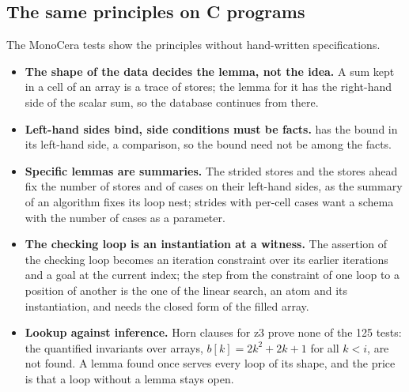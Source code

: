 \subsection{The same principles on C programs}\label{sec:principles:monocera}
The MonoCera tests show the principles without hand-written specifications.
\begin{itemize}[nosep]
\item \textbf{The shape of the data decides the lemma, not the idea.} A sum kept in a cell of an array is a trace of
  stores; the lemma for it has the right-hand side of the scalar sum, so the database continues from there.
\item \textbf{Left-hand sides bind, side conditions must be facts.}  has the bound in its
  left-hand side, a comparison, so the bound need not be among the facts.
\item \textbf{Specific lemmas are summaries.} The strided stores and the stores ahead fix the number of stores and of
  cases on their left-hand sides, as the summary of an algorithm fixes its loop nest; strides with per-cell cases want a
  schema with the number of cases as a parameter.
\item \textbf{The checking loop is an instantiation at a witness.} The assertion of the checking loop becomes an
  iteration constraint over its earlier iterations and a goal at the current index; the step from the constraint of one
  loop to a position of another is the one of the linear search, an atom and its instantiation, and needs the closed form
  of the filled array.
\item \textbf{Lookup against inference.} Horn clauses for z3 prove none of the 125 tests: the quantified invariants
  over arrays, $b[k] = 2k^2 + 2k + 1$ for all $k < i$, are not found. A lemma found once serves every loop of its shape,
  and the price is that a loop without a lemma stays open.
\end{itemize}

